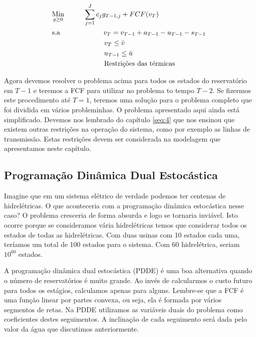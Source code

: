 \begin{align}
    & \underset{g\geq0}{\text{Min}} \hspace{1cm} \sum_{j=1}^J c_jg_{T-1,j}+FCF(v_T)  \\
    & \text{s.a}  \hspace{2.2cm} v_{T}=v_{T-1}+a_{T-1}-u_{T-1}-s_{T-1}   \\
    &             \hspace{2.65cm} v_{T}\leq \bar{v} \\
    &             \hspace{2.65cm} u_{T-1}\leq \bar{u} \\
    &             \hspace{2.65cm} \text{Restrições das térmicas}
\end{align}


Agora devemos resolver o problema acima para todos os estados do reservatório em $T-1$ e teremos a FCF para utilizar no problema to tempo $T-2$. Se fizermos este procedimento até $T=1$, teremos uma solução para o problema completo que foi dividida em vários probleminhas. O problema apresentado aqui ainda está simplificado. Devemos nos lembrado do capítulo \ref{seq:4} que nos ensinou que existem outras restrições na operação do sistema, como por exemplo as linhas de transmissão. Estas restrições devem ser considerada na modelagem que apresentamos neste capítulo. 

\subsection{Programação Dinâmica Dual Estocástica}

Imagine que em um sistema elétrico de verdade podemos ter centenas de hidrelétricas. O que aconteceria com a programação dinâmica estocástica nesse caso? O problema cresceria de forma absurda e logo se tornaria inviável. Isto ocorre porque se consideramos vária hidrelétricas temos que considerar todos os estados de todas as hidrelétricas. Com duas usinas com 10 estados cada uma, teríamos um total de 100 estados para o sistema. Com 60 hidrelétrica, seriam $10^60$ estados. 

A programação dinâmica dual estocástica (PDDE) é uma boa alternativa quando o número de reservatórios é muito grande. Ao invés de calcularmos o custo futuro para todos os estágios, calculamos apenas para alguns. Lembre-se que a FCF é uma função linear por partes convexa, ou seja, ela é formada por vários segmentos de retas. Na PDDE utilizamos as variáveis duais do problema como coeficientes destes seguimentos. A inclinação de cada seguimento será dada pelo valor da água que discutimos anteriormente. 

